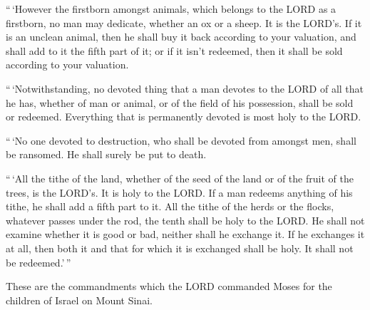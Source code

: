  ``\,`However the firstborn amongst animals, which belongs
to the LORD as a firstborn, no man may dedicate, whether an ox or a
sheep. It is the LORD's.  If it is an unclean animal, then
he shall buy it back according to your valuation, and shall add to it
the fifth part of it; or if it isn't redeemed, then it shall be sold
according to your valuation.

 ``\,`Notwithstanding, no devoted thing that a man devotes
to the LORD of all that he has, whether of man or animal, or of the
field of his possession, shall be sold or redeemed. Everything that is
permanently devoted is most holy to the LORD.

 ``\,`No one devoted to destruction, who shall be devoted
from amongst men, shall be ransomed. He shall surely be put to death.

 ``\,`All the tithe of the land, whether of the seed of the
land or of the fruit of the trees, is the LORD's. It is holy to the
LORD.  If a man redeems anything of his tithe, he shall add
a fifth part to it.  All the tithe of the herds or the
flocks, whatever passes under the rod, the tenth shall be holy to the
LORD.  He shall not examine whether it is good or bad,
neither shall he exchange it. If he exchanges it at all, then both it
and that for which it is exchanged shall be holy. It shall not be
redeemed.'\,''

 These are the commandments which the LORD commanded Moses
for the children of Israel on Mount Sinai.
